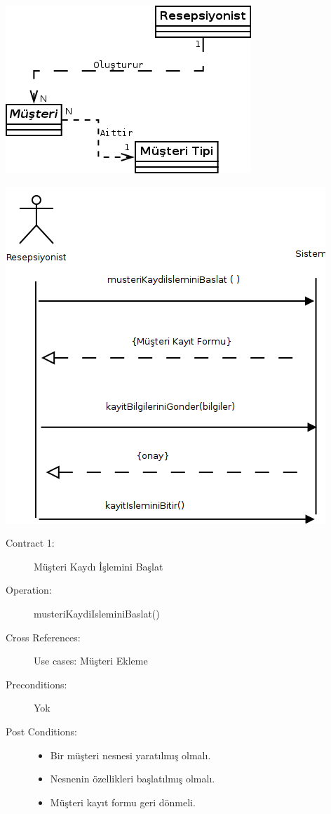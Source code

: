 \documentclass[12pt,a4paper]{report}
\begin{document}
\begin{center}
\includegraphics{dia/usecase1.png}
\end{center}

\newpage

\begin{center}
\includegraphics{dia/ssd-usecase1.png}
\end{center}

\newpage

\begin{description}
\item[Contract 1:] Müşteri Kaydı İşlemini Başlat 
\item[Operation:] musteriKaydiIsleminiBaslat()
\item[Cross References:] Use cases: Müşteri Ekleme
\item[Preconditions:] Yok
\item[Post Conditions:] \hspace{10 mm}
\begin{itemize} 
\item Bir müşteri nesnesi yaratılmış olmalı.
\item Nesnenin özellikleri başlatılmış olmalı.
\item Müşteri kayıt formu geri dönmeli. \\
\end{itemize}
\end{description}
\end{document}
